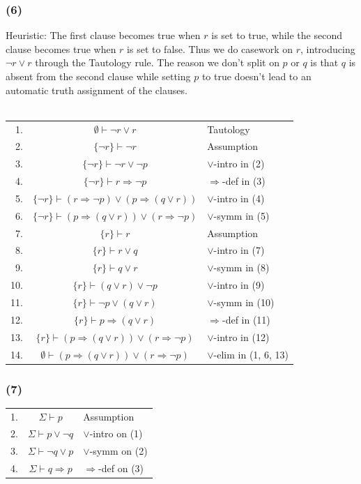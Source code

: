 \documentclass{article}
\begin{document}
\subsubsection*{(6)}
Heuristic: The first clause becomes true when $r$ is set to true, while the second clause becomes true when $r$ is set to false. Thus we do casework on $r$, introducing $\lnot r\lor r$ through the Tautology rule. The reason we don't split on $p$ or $q$ is that $q$ is absent from the second clause while setting $p$ to true doesn't lead to an automatic truth assignment of the clauses.\\
\\
\begin{tabular}{r c l}
    1. & $\emptyset\vdash \lnot r\lor r$ & Tautology\\
    2. & $\{\lnot r\}\vdash \lnot r$ & Assumption\\
    3. & $\{\lnot r\}\vdash \lnot r\lor \lnot p$ & $\lor$-intro in (2)\\
    4. & $\{\lnot r\}\vdash r\Rightarrow \lnot p$ & $\Rightarrow$-def in (3)\\
    5. & $\{\lnot r\}\vdash (r\Rightarrow \lnot p)\lor(p\Rightarrow(q\lor r))$ & $\lor$-intro in (4)\\
    6. & $\{\lnot r\}\vdash (p\Rightarrow(q\lor r))\lor (r\Rightarrow \lnot p)$ & $\lor$-symm in (5)\\
    7. & $\{r\}\vdash r$ & Assumption\\
    8. & $\{r\}\vdash r\lor q$ & $\lor$-intro in (7)\\
    9. & $\{r\}\vdash q\lor r$ & $\lor$-symm in (8)\\
    10. & $\{r\}\vdash (q\lor r)\lor\lnot p$ & $\lor$-intro in (9)\\
    11. & $\{r\}\vdash \lnot p\lor(q\lor r)$ & $\lor$-symm in (10)\\
    12. & $\{r\}\vdash p\Rightarrow(q\lor r)$ & $\Rightarrow$-def in (11)\\
    13. & $\{r\}\vdash (p\Rightarrow(q\lor r))\lor (r\Rightarrow \lnot p)$ & $\lor$-intro in (12)\\
    14. & $\emptyset\vdash (p\Rightarrow(q\lor r))\lor (r\Rightarrow \lnot p)$ & $\lor$-elim in (1, 6, 13)
\end{tabular}
\subsubsection*{(7)}
\begin{tabular}{r c l}
    1. & $\Sigma\vdash p$ & Assumption\\
    2. & $\Sigma\vdash p\lor \lnot q$ & $\lor$-intro on (1)\\
    3. & $\Sigma\vdash \lnot q\lor p$ & $\lor$-symm on (2)\\
    4. & $\Sigma\vdash q\Rightarrow p$ & $\Rightarrow$-def on (3)\\
\end{tabular}
\end{document}

